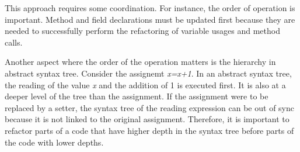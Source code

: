 This approach requires some coordination. For instance, the order of operation is important. Method and field declarations must be updated first because they are needed to successfully perform the refactoring of variable usages and method calls. 

Another aspect where the order of the operation matters is the hierarchy in abstract syntax tree. Consider the assignemt \textit{x=x+1}. In an abstract syntax tree, the reading of the value \textit{x} and the addition of 1 is executed first. It is also at a deeper level of the tree than the assignment. If the assignment were to be replaced by a setter, the syntax tree of the reading expression can be out of sync because it is not linked to the original assignment. Therefore, it is important to refactor parts of a code that have higher depth in the syntax tree before parts of the code with lower depths. 